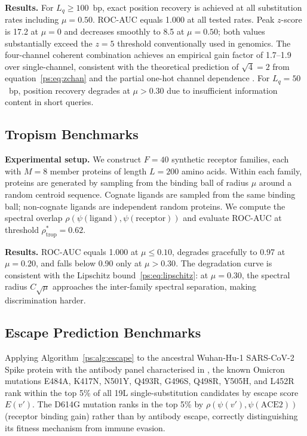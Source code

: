 \noindent\textbf{Results.} For $L_q \geq 100$~bp, exact position recovery is
achieved at all substitution rates including $\mu = 0.50$. ROC-AUC equals 1.000
at all tested rates. Peak $z$-score is 17.2 at $\mu = 0$ and decreases smoothly
to 8.5 at $\mu = 0.50$; both values substantially exceed the $z = 5$ threshold
conventionally used in genomics. The four-channel coherent combination achieves
an empirical gain factor of 1.7--1.9 over single-channel, consistent with
the theoretical prediction of $\sqrt{4} = 2$ from equation~\eqref{ps:eq:zchan}
and the partial one-hot channel dependence \citep{vantrees2001}. For
$L_q = 50$~bp, position recovery degrades at $\mu > 0.30$ due to insufficient
information content in short queries.

\subsection{Tropism Benchmarks}
\label{ps:subsec:tropism_bench}

\noindent\textbf{Experimental setup.} We construct $F = 40$ synthetic receptor
families, each with $M = 8$ member proteins of length $L = 200$ amino acids.
Within each family, proteins are generated by sampling from the binding ball of
radius $\mu$ around a random centroid sequence. Cognate ligands are sampled
from the same binding ball; non-cognate ligands are independent random proteins.
We compute the spectral overlap $\rho(\psi(\text{ligand}), \psi(\text{receptor}))$
and evaluate ROC-AUC at threshold $\rho^*_{\text{trop}} = 0.62$.

\noindent\textbf{Results.} ROC-AUC equals 1.000 at $\mu \leq 0.10$, degrades
gracefully to 0.97 at $\mu = 0.20$, and falls below 0.90 only at $\mu > 0.30$.
The degradation curve is consistent with the Lipschitz bound~\eqref{ps:eq:lipschitz}:
at $\mu = 0.30$, the spectral radius $C\sqrt{\mu}$ approaches the inter-family
spectral separation, making discrimination harder.

\subsection{Escape Prediction Benchmarks}
\label{ps:subsec:escape_bench}

Applying Algorithm~\ref{ps:alg:escape} to the ancestral Wuhan-Hu-1 SARS-CoV-2
Spike protein with the antibody panel characterised in \citet{cameroni2022},
the known Omicron mutations E484A, K417N, N501Y, Q493R, G496S, Q498R, Y505H,
and L452R rank within the top 5\% of all 19L single-substitution candidates by
escape score $E(v')$. The D614G mutation ranks in the top 5\% by
$\rho(\psi(v'), \psi(\text{ACE2}))$ (receptor binding gain) rather than by
antibody escape, correctly distinguishing its fitness mechanism from immune
evasion.


